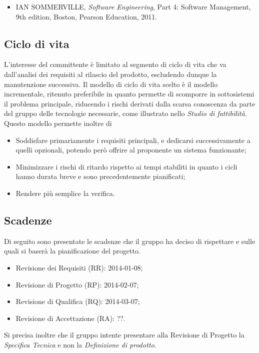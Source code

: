 		\begin{itemize}
		\item IAN SOMMERVILLE, \textit{Software Engineering}, Part 4: Software Management, 9th edition, Boston, Pearson Education, 2011.
		\end{itemize}
		
	\subsection{Ciclo di vita}
	L'interesse del committente è limitato al segmento di ciclo di vita che va dall'analisi dei requisiti al rilascio del prodotto, escludendo dunque la manutenzione successiva.
	Il modello di ciclo di vita scelto è il modello incrementale, ritenuto preferibile in quanto permette di scomporre in sottosistemi il problema principale, riducendo i rischi derivati dalla scarsa conoscenza da parte del gruppo delle tecnologie necessarie, come illustrato nello \textit{Studio di fattibilità}.
	Questo modello permette inoltre di
	\begin{itemize}
	\item Soddisfare primariamente i requisiti principali, e dedicarsi successivamente a quelli opzionali, potendo però offrire al proponente un sistema funzionante;
	\item Minimizzare i rischi di ritardo rispetto ai tempi stabiliti in quanto i cicli hanno durata breve e sono precedentemente pianificati;
	\item Rendere più semplice la verifica.
	\end{itemize}
	\subsection{Scadenze}
	Di seguito sono presentate le scadenze che il gruppo ha deciso di rispettare e sulle quali si baserà la pianificazione del progetto.
	\begin{itemize}
	\item Revisione dei Requisiti (RR): 2014-01-08;
	\item Revisione di Progetto (RP): 2014-02-07;
	\item Revisione di Qualifica (RQ): 2014-03-07;
	\item Revisione di Accettazione (RA): ??.
	\end{itemize}
	Si precisa inoltre che il gruppo intente presentare alla Revisione di Progetto la \textit{Specifica Tecnica} e non la \textit{Definizione di prodotto}.
